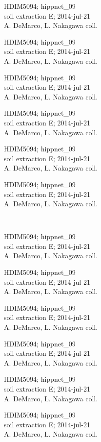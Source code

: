 \documentclass[2pt]{extarticle}
\begin{document}
\noindent
\parbox{0.16\textwidth}{\tiny \raggedright \rule[-0.3\baselineskip]{0pt}{10pt}HDIM5094; hippnet\_09\\ soil extraction E; 2014-jul-21\\ A. DeMarco, L. Nakagawa coll.}
\parbox{0.16\textwidth}{\tiny \raggedright \rule[-0.3\baselineskip]{0pt}{10pt}HDIM5094; hippnet\_09\\ soil extraction E; 2014-jul-21\\ A. DeMarco, L. Nakagawa coll.}
\parbox{0.16\textwidth}{\tiny \raggedright \rule[-0.3\baselineskip]{0pt}{10pt}HDIM5094; hippnet\_09\\ soil extraction E; 2014-jul-21\\ A. DeMarco, L. Nakagawa coll.}
\parbox{0.16\textwidth}{\tiny \raggedright \rule[-0.3\baselineskip]{0pt}{10pt}HDIM5094; hippnet\_09\\ soil extraction E; 2014-jul-21\\ A. DeMarco, L. Nakagawa coll.}
\parbox{0.16\textwidth}{\tiny \raggedright \rule[-0.3\baselineskip]{0pt}{10pt}HDIM5094; hippnet\_09\\ soil extraction E; 2014-jul-21\\ A. DeMarco, L. Nakagawa coll.}
\parbox{0.16\textwidth}{\tiny \raggedright \rule[-0.3\baselineskip]{0pt}{10pt}HDIM5094; hippnet\_09\\ soil extraction E; 2014-jul-21\\ A. DeMarco, L. Nakagawa coll.} \\ 
\vspace{0.001in} 

\noindent
\parbox{0.16\textwidth}{\tiny \raggedright \rule[-0.3\baselineskip]{0pt}{10pt}HDIM5094; hippnet\_09\\ soil extraction E; 2014-jul-21\\ A. DeMarco, L. Nakagawa coll.}
\parbox{0.16\textwidth}{\tiny \raggedright \rule[-0.3\baselineskip]{0pt}{10pt}HDIM5094; hippnet\_09\\ soil extraction E; 2014-jul-21\\ A. DeMarco, L. Nakagawa coll.}
\parbox{0.16\textwidth}{\tiny \raggedright \rule[-0.3\baselineskip]{0pt}{10pt}HDIM5094; hippnet\_09\\ soil extraction E; 2014-jul-21\\ A. DeMarco, L. Nakagawa coll.}
\parbox{0.16\textwidth}{\tiny \raggedright \rule[-0.3\baselineskip]{0pt}{10pt}HDIM5094; hippnet\_09\\ soil extraction E; 2014-jul-21\\ A. DeMarco, L. Nakagawa coll.}
\parbox{0.16\textwidth}{\tiny \raggedright \rule[-0.3\baselineskip]{0pt}{10pt}HDIM5094; hippnet\_09\\ soil extraction E; 2014-jul-21\\ A. DeMarco, L. Nakagawa coll.}
\parbox{0.16\textwidth}{\tiny \raggedright \rule[-0.3\baselineskip]{0pt}{10pt}HDIM5094; hippnet\_09\\ soil extraction E; 2014-jul-21\\ A. DeMarco, L. Nakagawa coll.} \\ 
\vspace{0.001in} 
\end{document}

